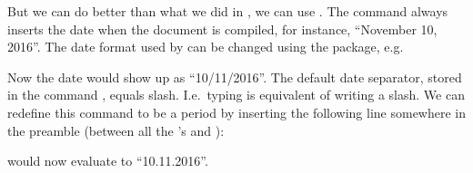 {\index{\latexin{\today}}
But we can do better than what we did in , we can use \latexin{\date{\today}}. The command \latexin{\today} always inserts the date when the document is compiled, for instance, ``November 10, 2016''. The date format used by \latexin{\today} can be changed using the  package, e.g.\

\latexone{\usepackage[ddmmyyyy]{datetime}}
\noindent Now the date would show up as ``10/11/2016''. The default date separator, stored in the command \latexin{\dateseparator}, equals slash. I.e.\ typing \latexin{\dateseparator} is equivalent of writing a slash. We can redefine this command to be a period by inserting the following line somewhere in the preamble (between all the \latexin{\usepackage}'s and \latexin{}):

\latexone{\renewcommand{\dateseparator}{.}}
\noindent\latexin{\today} would now evaluate to ``10.11.2016''.

}
